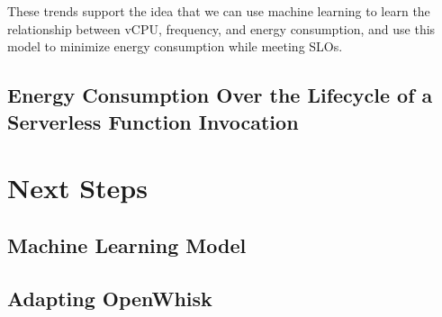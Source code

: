 \documentclass[times, 10pt,twocolumn]{article}
\begin{document}
These trends support the idea that we can use machine learning to learn the relationship between vCPU, frequency, and energy consumption, and use this model to minimize energy consumption while meeting SLOs.

\subsection{Energy Consumption Over the Lifecycle of a Serverless Function Invocation}







\section{Next Steps}

\subsection{Machine Learning Model}

\subsection{Adapting OpenWhisk}





\end{document}
